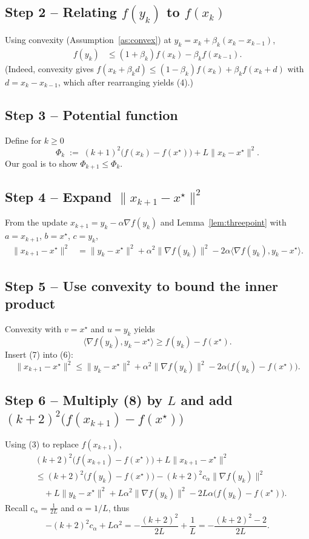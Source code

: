 \documentclass[11pt]{article}
\begin{document}
\subsection*{Step 2 – Relating $f(y_k)$ to $f(x_k)$}
Using convexity (Assumption~\ref{as:convex}) at $y_k = x_k+\beta_k (x_k-x_{k-1})$,
\begin{align}
f(y_k) &\le (1+\beta_k)f(x_k)-\beta_k f(x_{k-1}).
\tag{4}
\end{align}
(Indeed, convexity gives $f(x_k+\beta_k d)\le (1-\beta_k)f(x_k)+\beta_k f(x_k+d)$ with $d=x_k-x_{k-1}$, which after rearranging yields (4).)

\subsection*{Step 3 – Potential function}
Define for $k\ge 0$
\[
\Phi_k \;:=\; (k+1)^{2}\bigl(f(x_k)-f(x^{\star})\bigr)+L\|x_k-x^{\star}\|^{2}.
\tag{5}
\]
Our goal is to show $\Phi_{k+1}\le\Phi_k$.

\subsection*{Step 4 – Expand $\|x_{k+1}-x^{\star}\|^{2}$}
From the update $x_{k+1}=y_k-\alpha\nabla f(y_k)$ and Lemma~\ref{lem:threepoint} with $a=x_{k+1}$, $b=x^{\star}$, $c=y_k$,
\begin{align}
\|x_{k+1}-x^{\star}\|^{2}
   &=\|y_k-x^{\star}\|^{2}+\alpha^{2}\|\nabla f(y_k)\|^{2}
     -2\alpha\langle\nabla f(y_k),y_k-x^{\star}\rangle.
\tag{6}
\end{align}

\subsection*{Step 5 – Use convexity to bound the inner product}
Convexity with $v=x^{\star}$ and $u=y_k$ yields
\[
\langle\nabla f(y_k),y_k-x^{\star}\rangle\ge f(y_k)-f(x^{\star}).
\tag{7}
\]
Insert (7) into (6):
\[
\|x_{k+1}-x^{\star}\|^{2}\le \|y_k-x^{\star}\|^{2}
    +\alpha^{2}\|\nabla f(y_k)\|^{2}
    -2\alpha\bigl(f(y_k)-f(x^{\star})\bigr).
\tag{8}
\]

\subsection*{Step 6 – Multiply (8) by $L$ and add $(k+2)^{2}\bigl(f(x_{k+1})-f(x^{\star})\bigr)$}
Using (3) to replace $f(x_{k+1})$,
\begin{align}
&(k+2)^{2}\!\bigl(f(x_{k+1})-f(x^{\star})\bigr)
   +L\|x_{k+1}-x^{\star}\|^{2} \nonumber\\
 &\le (k+2)^{2}\!\bigl(f(y_k)-f(x^{\star})\bigr)
      -(k+2)^{2}c_{\alpha}\|\nabla f(y_k)\|^{2} \nonumber\\
 &\quad +L\|y_k-x^{\star}\|^{2}
      +L\alpha^{2}\|\nabla f(y_k)\|^{2}
      -2L\alpha\bigl(f(y_k)-f(x^{\star})\bigr). \tag{9}
\end{align}
Recall $c_{\alpha}= \frac{1}{2L}$ and $\alpha=1/L$, thus
\[
-(k+2)^{2}c_{\alpha}+L\alpha^{2}
   = -\frac{(k+2)^{2}}{2L}+\frac{1}{L}
   = -\frac{(k+2)^{2}-2}{2L}. \tag{10}
\]
\end{document}
